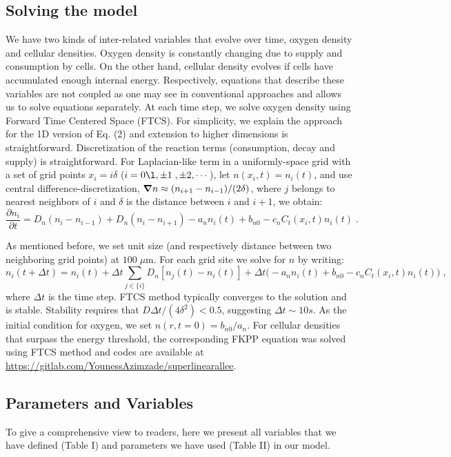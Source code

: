 \documentclass[aps,prl, superscriptaddress,groupedaddress]{revtex4}  %
\begin{document}
 \subsection{Solving the model} 
 We have two kinds of inter-related variables that evolve over time, oxygen density and cellular densities.  Oxygen density is constantly changing due to supply and consumption by cells. On the other hand, cellular density evolves if cells have accumulated enough internal energy. Respectively, equations that describe these variables are not coupled as one may see in conventional approaches and allows us to solve equations separately. At each time step, we solve oxygen density using Forward Time Centered Space (FTCS). For simplicity, we explain the approach for the 1D version of Eq. (2) and extension to higher dimensions is straightforward. 
		Discretization of the reaction terms (consumption, decay and supply) is straightforward. For Laplacian-like term in a uniformly-space grid with a set of grid points $x_i=i\delta$ ($i=0\l,\pm 1\;,\pm 2,\cdots$), let $n(x_i,t)=n_i(t)$, and use central difference-discretization, $\mbox{\boldmath$\nabla$}n\approx 
		(n_{i+1}-n_{i-1})/(2\delta)$, where  $j$ belongs to nearest neighbors of $i$ and  $\delta$ is the distance between $i$ and $i+1$, we obtain: 
		\begin{equation}
			\frac{\partial n_i}{\partial t}=D_{n}(n_i-n_{i-1})+D_{n}(n_i-n_{i+1})- a_n n_i(t)+ b_{n0}- c_n C_t(x_i,t) n_i(t) \;.
	\end{equation}  
	
	  As mentioned before, we set unit size (and respectively distance between two neighboring grid points)  at $100\;\mu$m.  For each grid site we solve for $n$ by writing: 
		\begin{displaymath}
			n_i(t+\Delta t)=n_i(t)+ \Delta t \sum_{j\in\{i\}}D_{n}[n_j(t)-n_i(t)] +\Delta t \big(-a_n n_i(t)+b_{n0}-c_n C_t(x_i,t) n_i(t) \big)\;,
		\end{displaymath}
		where $\Delta t$ is the time step. FTCS method  typically converges to the solution and is stable. Stability requires that 
		$D\Delta t/(4\delta^2)<0.5$, suggesting  $\Delta t \sim 10 s$. As the initial condition for oxygen, we set $n(r,t=0)= b_{n0} /a_n$.  For cellular densities that surpass the energy threshold, the corresponding FKPP equation was solved using FTCS method \cite{azimzade2019effect} and codes are available at \url{https://gitlab.com/YounessAzimzade/superlinearallee}.    
	
	
 \subsection{Parameters and Variables} 
 To give a comprehensive view to readers, here we present all variables that we have defined (Table I)  and parameters we have used (Table II) in our model.   \\
	
\end{document}
